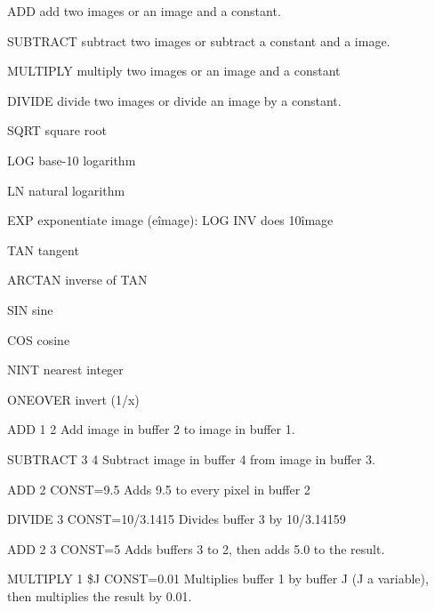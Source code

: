{\newpage\clearpage
{}%
\begin{example}
  \item[ADD\hfill]{add two images or an image and a constant.}
  \item[SUBTRACT\hfill]{subtract two images or subtract a constant and a 
       image.}
  \item[MULTIPLY\hfill]{multiply two images or an image and a constant}
  \item[DIVIDE\hfill]{divide two images or divide an image by a constant.}
  \item[SQRT\hfill]{square root}
  \item[LOG\hfill]{base-10 logarithm}
  \item[LN\hfill]{natural logarithm}
  \item[EXP\hfill]{exponentiate image (e\^image):  LOG INV does 10\^image}
  \item[TAN\hfill]{tangent}
  \item[ARCTAN\hfill]{inverse of TAN}
  \item[SIN\hfill]{sine}
  \item[COS\hfill]{cosine}
  \item[NINT\hfill]{nearest integer}
  \item[ONEOVER\hfill]{invert (1/x)}
\end{example}%
\lthtmlfigureZ
\lthtmlcheckvsize\clearpage}

{\newpage\clearpage
{}%
\begin{example}
  \item[ADD 1 2\hfill]{Add image in buffer 2 to image in buffer 1.}
  \item[SUBTRACT 3 4\hfill]{Subtract image in buffer 4 from image in buffer 3.}
\end{example}%
\lthtmlfigureZ
\lthtmlcheckvsize\clearpage}

{\newpage\clearpage
{}%
\begin{example}
  \item[ADD 2 CONST=9.5\hfill]{Adds 9.5 to every pixel in buffer 2}
  \item[DIVIDE 3 CONST=10/3.1415\hfill]{  Divides buffer 3 by 10/3.14159}
\end{example}%
\lthtmlfigureZ
\lthtmlcheckvsize\clearpage}

{\newpage\clearpage
{}%
\begin{example}
  \item[ADD 2 3 CONST=5\hfill]{Adds buffers 3 to 2, then adds 5.0
       to the result.}
  \item[MULTIPLY 1 \$J CONST=0.01\hfill]{ Multiplies buffer 1 by buffer J
       (J a variable), then multiplies the result by 0.01.}
\end{example}%
\lthtmlfigureZ
\lthtmlcheckvsize\clearpage}

